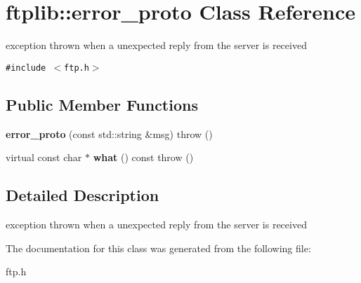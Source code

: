 \hypertarget{classftplib_1_1error__proto}{
\section{ftplib::error\_\-proto Class Reference}
\label{classftplib_1_1error__proto}
}
exception thrown when a unexpected reply from the server is received  


{\tt \#include $<$ftp.h$>$}

\subsection*{Public Member Functions}
\begin{CompactItemize}
\item 
\hypertarget{classftplib_1_1error__proto_4d9a71a8162f838cb1cdd2997f64819b}{
\textbf{error\_\-proto} (const std::string \&msg)  throw ()}
\label{classftplib_1_1error__proto_4d9a71a8162f838cb1cdd2997f64819b}

\item 
\hypertarget{classftplib_1_1error__proto_67fb850475bc3becb1959822d0d6f470}{
virtual const char $\ast$ \textbf{what} () const   throw ()}
\label{classftplib_1_1error__proto_67fb850475bc3becb1959822d0d6f470}

\end{CompactItemize}


\subsection{Detailed Description}
exception thrown when a unexpected reply from the server is received 

The documentation for this class was generated from the following file:\begin{CompactItemize}
\item 
ftp.h\end{CompactItemize}
